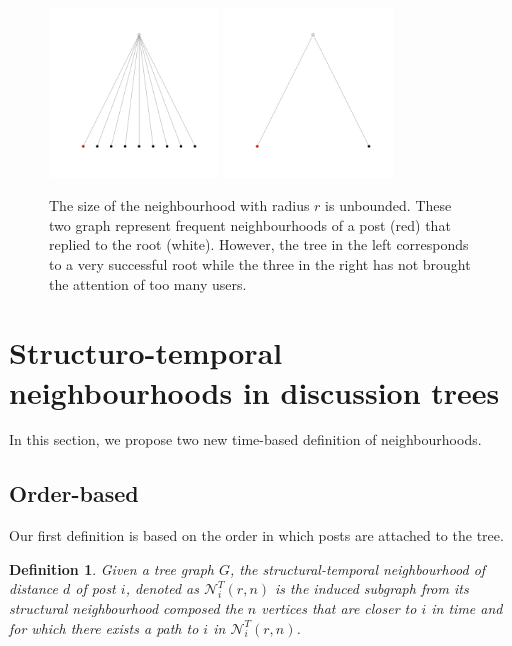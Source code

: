 \documentclass[9pt,technote]{IEEEtran}
\newtheorem{definition}{Definition}
\begin{document}
\begin{figure}
	\centering
	\includegraphics[width=0.4\textwidth]{large_neighbourhood}
	\includegraphics[width=0.4\textwidth]{small_neighbourhood}
	\caption{The size of the neighbourhood with radius $r$ is unbounded. These two graph represent frequent neighbourhoods of a post (red) that replied to the root (white). However, the tree in the left corresponds to a very successful root while the three in the right has not brought the attention of too many users.}
	\label{fig:large_neighbourhood}
\end{figure}


\section{Structuro-temporal neighbourhoods in discussion trees}
In this section, we propose two new time-based definition of neighbourhoods.

\subsection{Order-based}
Our first definition is based on the order in which posts are attached to the tree. 
\begin{definition}
Given a tree graph $G$, the \textit{structural-temporal neighbourhood} of distance $d$ of post $i$, denoted as $\mathcal{N}_{i}^T(r,n)$ is the induced subgraph from its structural neighbourhood composed the $n$ vertices that are closer to $i$ in time and for which there exists a path to $i$ in $\mathcal{N}_{i}^T(r,n)$.  
\end{definition}
\end{document}
